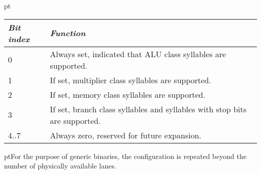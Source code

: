  pt\noindent\begin{tabular}{|l|p{12cm}|}
\hline
\emph{Bit index} & \emph{Function} \\
\hline
0 & Always set, indicated that ALU class syllables are supported. \\
\hline
1 & If set, multiplier class syllables are supported. \\
\hline
2 & If set, memory class syllables are supported. \\
\hline
3 & If set, branch class syllables and syllables with stop bits are supported. \\
\hline
4..7 & Always zero, reserved for future expansion. \\
\hline
\end{tabular}

 pt\noindent For the purpose of generic binaries, the configuration is
repeated beyond the number of physically available lanes.
